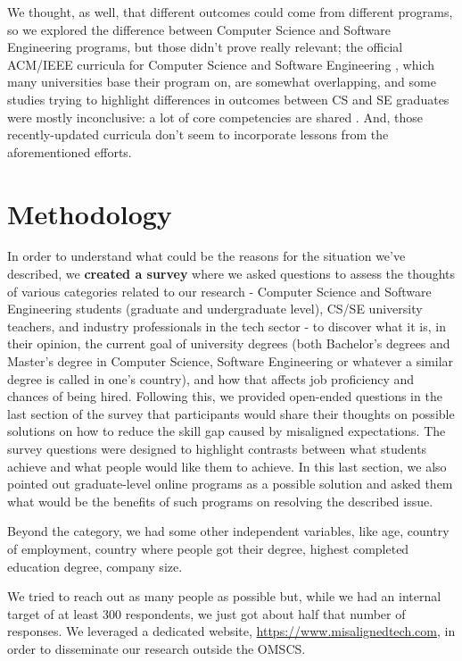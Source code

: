 \documentclass{sigchi}
\begin{document}
We thought, as well, that different outcomes could come from different programs, so we explored the difference between Computer Science and Software Engineering programs, but those didn't prove really relevant; the official ACM/IEEE curricula for Computer Science \cite{Force2013} and Software Engineering \cite{Ardis2015}, which many universities base their program on, are somewhat overlapping, and some studies trying to highlight differences in outcomes between CS and SE graduates were mostly inconclusive: a lot of core competencies are shared \cite{Meziane2004} \cite{Rasool2014}. And, those recently-updated curricula don't seem to incorporate lessons from the aforementioned efforts.

\section{Methodology}
In order to understand what could be the reasons for the situation we've described, we \textbf{created a survey} where we asked questions to assess the thoughts of various categories related to our research - Computer Science and Software Engineering students (graduate and undergraduate level), CS/SE university teachers, and industry professionals in the tech sector - to discover what it is, in their opinion, the current goal of university degrees (both Bachelor's degrees and Master's degree in Computer Science, Software Engineering or whatever a similar degree is called in one's country), and how that affects job proficiency and chances of being hired. Following this, we provided open-ended questions in the last section of the survey that participants would share their thoughts on possible solutions on how to reduce the skill gap caused by misaligned expectations. The survey questions were designed to highlight contrasts between what students achieve and what people would like them to achieve. In this last section, we also pointed out graduate-level online programs as a possible solution and asked them what would be the benefits of such programs on resolving the described issue.

Beyond the category, we had some other independent variables, like age, country of employment, country where people got their degree, highest completed education degree, company size.

We tried to reach out as many people as possible but, while we had an internal target of at least 300 respondents, we just got about half that number of responses. We leveraged a dedicated website, \url{https://www.misalignedtech.com}, in order to disseminate our research outside the OMSCS.
\end{document}

